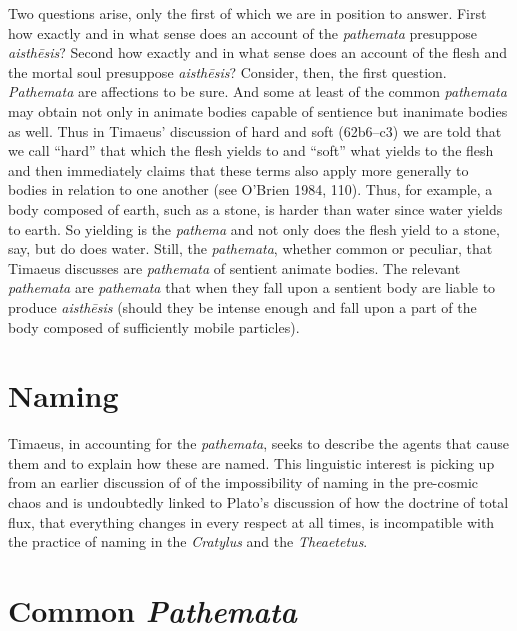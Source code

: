Two questions arise, only the first of which we are in position to answer. First how exactly and in what sense does an account of the \emph{pathemata} presuppose \emph{aisthēsis}? Second how exactly and in what sense does an account of the flesh and the mortal soul presuppose \emph{aisthēsis}? Consider, then, the first question. \emph{Pathemata} are affections to be sure. And some at least of the common \emph{pathemata} may obtain not only in animate bodies capable of sentience but inanimate bodies as well. Thus in Timaeus' discussion of hard and soft (62b6--c3) we are told that we call ``hard'' that which the flesh yields to and ``soft'' what yields to the flesh and then immediately claims that these terms also apply more generally to bodies in relation to one another (see O'Brien 1984, 110). Thus, for example, a body composed of earth, such as a stone, is harder than water since water yields to earth. So yielding is the \emph{pathema} and not only does the flesh yield to a stone, say, but do does water. Still, the \emph{pathemata}, whether common or peculiar, that Timaeus discusses are \emph{pathemata} of sentient animate bodies. The relevant \emph{pathemata} are \emph{pathemata} that when they fall upon a sentient body are liable to produce \emph{aisthēsis} (should they be intense enough and fall upon a part of the body composed of sufficiently mobile particles). 


\section{Naming} %
\label{sec:naming}

Timaeus, in accounting for the \emph{pathemata}, seeks to describe the agents that cause them and to explain how these are named. This linguistic interest is picking up from an earlier discussion of of the impossibility of naming in the pre-cosmic chaos and is undoubtedly linked to Plato's discussion of how the doctrine of total flux, that everything changes in every respect at all times, is incompatible with the practice of naming in the \emph{Cratylus} and the \emph{Theaetetus}.


\section{Common \emph{Pathemata}} %
\label{sec:common_emph_pathemata}

